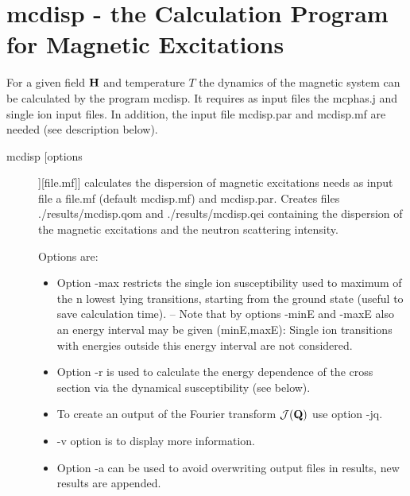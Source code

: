 
\section{{\prg mcdisp} - the Calculation Program for Magnetic Excitations}\label{mcdisp}

For a given field $\mathbf H$ and temperature $T$ the dynamics of the magnetic system
can be calculated by the program {\prg mcdisp}. It requires as input files
the {\prg mcphas.j} and single ion input files. In addition, the input file
{\prg mcdisp.par} and {\prg mcdisp.mf} are needed (see description below).

\begin{description}
\item [\prg mcdisp [options]][file.mf]]  
      calculates the dispersion of magnetic excitations
	  needs as input file a {\prg file.mf} (default {\prg mcdisp.mf})
				and {\prg mcdisp.par}.  Creates  
				files {\prg ./results/mcdisp.qom} and {\prg ./results/mcdisp.qei}
				containing the dispersion of the magnetic excitations and the neutron
				scattering intensity. 
				
				Options are:
				 \begin{itemize}
				\item Option {\prg -max} restricts the single ion susceptibility
				used to maximum of  the n lowest lying transitions, starting
				from the ground state (useful to save calculation time).
--
			        Note that by options {\prg -minE} and {\prg -maxE}
				also an energy interval may be given (minE,maxE):
				Single ion transitions with energies outside this
				energy interval are not considered.
				
				\item Option {\prg -r} is used to calculate the energy dependence
				of the cross section via the dynamical susceptibility (see below).
				\item To create an output
				of the Fourier transform ${\mathcal J}({\mathbf Q})$ use option
				{\prg -jq}. 
				\item {\prg -v} option is to display more information.
                                
				\item Option {\prg -a} can be used to avoid overwriting output files in results, new results
				are appended.
								

\end{itemize}
\end{description}
